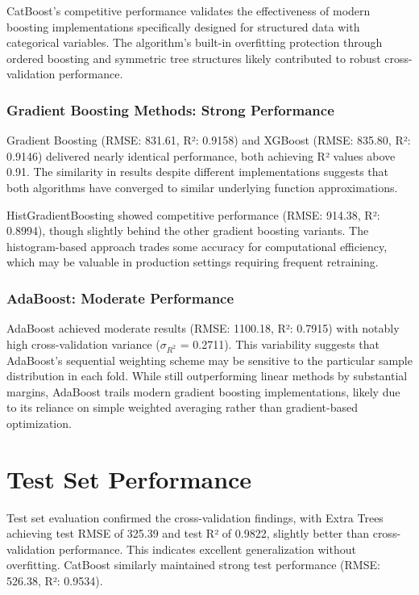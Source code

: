 CatBoost's competitive performance validates the effectiveness of modern boosting implementations specifically designed for structured data with categorical variables. The algorithm's built-in overfitting protection through ordered boosting and symmetric tree structures likely contributed to robust cross-validation performance.

\subsubsection{Gradient Boosting Methods: Strong Performance}

Gradient Boosting (RMSE: 831.61, R²: 0.9158) and XGBoost (RMSE: 835.80, R²: 0.9146) delivered nearly identical performance, both achieving R² values above 0.91. The similarity in results despite different implementations suggests that both algorithms have converged to similar underlying function approximations.

HistGradientBoosting showed competitive performance (RMSE: 914.38, R²: 0.8994), though slightly behind the other gradient boosting variants. The histogram-based approach trades some accuracy for computational efficiency, which may be valuable in production settings requiring frequent retraining.

\subsubsection{AdaBoost: Moderate Performance}

AdaBoost achieved moderate results (RMSE: 1100.18, R²: 0.7915) with notably high cross-validation variance ($\sigma_{R^2}$ = 0.2711). This variability suggests that AdaBoost's sequential weighting scheme may be sensitive to the particular sample distribution in each fold. While still outperforming linear methods by substantial margins, AdaBoost trails modern gradient boosting implementations, likely due to its reliance on simple weighted averaging rather than gradient-based optimization.

\section{Test Set Performance}

Test set evaluation confirmed the cross-validation findings, with Extra Trees achieving test RMSE of 325.39 and test R² of 0.9822, slightly better than cross-validation performance. This indicates excellent generalization without overfitting. CatBoost similarly maintained strong test performance (RMSE: 526.38, R²: 0.9534).

